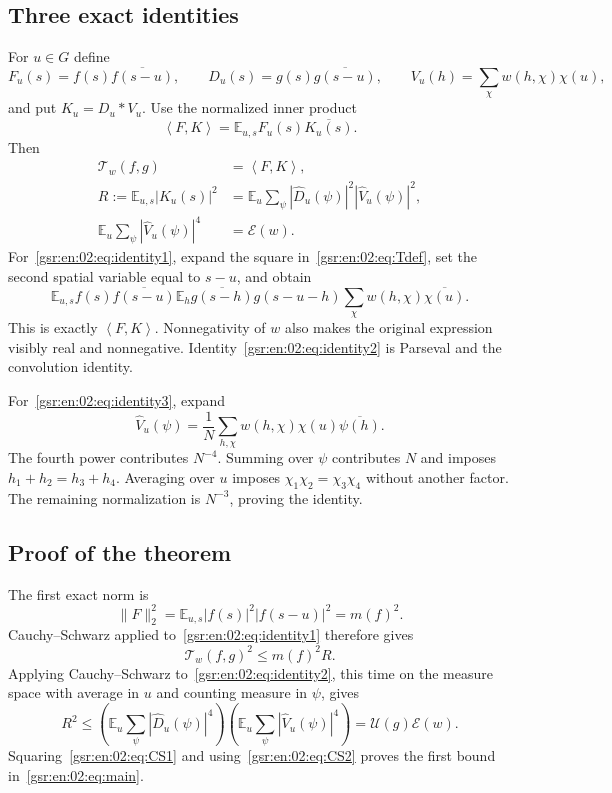 \documentclass[11pt,letterpaper]{article}
\numberwithin{equation}{section}
\theoremstyle{definition}
\theoremstyle{remark}
\newcommand{\E}{\mathbb E}
\newcommand{\1}{\mathbf 1}
\newcommand{\U}{\mathcal U}
\newcommand{\calE}{\mathcal E}
\newcommand{\calT}{\mathcal T}
\newcommand{\ip}[2]{\left\langle #1,#2\right\rangle}
\begin{document}
\subsection{Three exact identities}
For $u\in G$ define
\[
 F_u(s)=f(s)\overline{f(s-u)},\qquad
 D_u(s)=g(s)\overline{g(s-u)},\qquad
 V_u(h)=\sum_\chi w(h,\chi)\chi(u),
\]
and put $K_u=D_u*V_u$. Use the normalized inner product
\[
 \ip{F}{K}=\E_{u,s}F_u(s)\overline{K_u(s)}.
\]
Then
\begin{align}
 \calT_w(f,g)&=\ip{F}{K}, \label{gsr:en:02:eq:identity1}\\
 R:=\E_{u,s}|K_u(s)|^2
   &=\E_u\sum_\psi|\widehat D_u(\psi)|^2
                         |\widehat V_u(\psi)|^2, \label{gsr:en:02:eq:identity2}\\
 \E_u\sum_\psi|\widehat V_u(\psi)|^4&=\calE(w). \label{gsr:en:02:eq:identity3}
\end{align}
For~\eqref{gsr:en:02:eq:identity1}, expand the square in~\eqref{gsr:en:02:eq:Tdef}, set the second spatial variable equal to $s-u$, and obtain
\[
 \E_{u,s} f(s)\overline{f(s-u)}
 \E_h \overline{g(s-h)}g(s-u-h)
                  \sum_\chi w(h,\chi)\overline{\chi(u)}.
\]
This is exactly $\ip{F}{K}$. Nonnegativity of $w$ also makes the original expression visibly real and nonnegative. Identity~\eqref{gsr:en:02:eq:identity2} is Parseval and the convolution identity.

For~\eqref{gsr:en:02:eq:identity3}, expand
\[
 \widehat V_u(\psi)=\frac1N\sum_{h,\chi}
                  w(h,\chi)\chi(u)\overline{\psi(h)}.
\]
The fourth power contributes $N^{-4}$. Summing over $\psi$ contributes $N$ and imposes $h_1+h_2=h_3+h_4$. Averaging over $u$ imposes $\chi_1\chi_2=\chi_3\chi_4$ without another factor. The remaining normalization is $N^{-3}$, proving the identity.

\subsection{Proof of the theorem}
The first exact norm is
\[
 \|F\|_2^2=\E_{u,s}|f(s)|^2|f(s-u)|^2=m(f)^2.
\]
Cauchy--Schwarz applied to~\eqref{gsr:en:02:eq:identity1} therefore gives
\begin{equation}\label{gsr:en:02:eq:CS1}
 \calT_w(f,g)^2\leq m(f)^2R.
\end{equation}
Applying Cauchy--Schwarz to~\eqref{gsr:en:02:eq:identity2}, this time on the measure space with average in $u$ and counting measure in $\psi$, gives
\begin{equation}\label{gsr:en:02:eq:CS2}
 R^2\leq
 \left(\E_u\sum_\psi|\widehat D_u(\psi)|^4\right)
 \left(\E_u\sum_\psi|\widehat V_u(\psi)|^4\right)
 =\U(g)\calE(w).
\end{equation}
Squaring~\eqref{gsr:en:02:eq:CS1} and using~\eqref{gsr:en:02:eq:CS2} proves the first bound in~\eqref{gsr:en:02:eq:main}.
\end{document}
